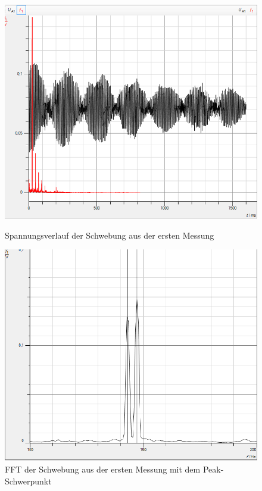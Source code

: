 \documentclass[a4paper, 11pt]{article}
\begin{document}
\begin{figure}[H]
	\begin{minipage}[t]{0.45\linewidth}
	\includegraphics[scale=0.4]{../Schwebung1.png}
	\caption{Spannungsverlauf der Schwebung aus der ersten Messung}
	\label{Abbildung 5}
	\end{minipage}
	\hspace{0.1\linewidth}
	\begin{minipage}[t]{0.45\linewidth}
	\includegraphics[scale=0.4]{../Schwebung1F.png}
	\caption{FFT der Schwebung aus der ersten Messung mit dem Peak-Schwerpunkt}
	\label{Abbildung 6}
	\end{minipage}
	\label{fig:Aufbau des Versuchs}
\end{figure}
\end{document}
